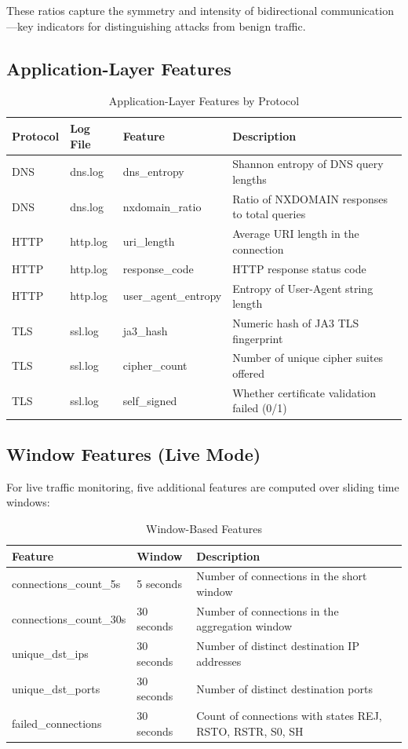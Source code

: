 \documentclass[12pt,a4paper,twoside]{report}
\begin{document}
These ratios capture the symmetry and intensity of bidirectional communication—key indicators for distinguishing attacks from benign traffic.

\subsection{Application-Layer Features}

\begin{table}[H]
\centering
\caption{Application-Layer Features by Protocol}
\begin{tabularx}{\textwidth}{lllX}
\toprule
\textbf{Protocol} & \textbf{Log File} & \textbf{Feature} & \textbf{Description} \\
\midrule
DNS & dns.log & dns\_entropy & Shannon entropy of DNS query lengths \\
DNS & dns.log & nxdomain\_ratio & Ratio of NXDOMAIN responses to total queries \\
HTTP & http.log & uri\_length & Average URI length in the connection \\
HTTP & http.log & response\_code & HTTP response status code \\
HTTP & http.log & user\_agent\_entropy & Entropy of User-Agent string length \\
TLS & ssl.log & ja3\_hash & Numeric hash of JA3 TLS fingerprint \\
TLS & ssl.log & cipher\_count & Number of unique cipher suites offered \\
TLS & ssl.log & self\_signed & Whether certificate validation failed (0/1) \\
\bottomrule
\end{tabularx}
\end{table}

\subsection{Window Features (Live Mode)}

For live traffic monitoring, five additional features are computed over sliding time windows:

\begin{table}[H]
\centering
\caption{Window-Based Features}
\begin{tabularx}{\textwidth}{llX}
\toprule
\textbf{Feature} & \textbf{Window} & \textbf{Description} \\
\midrule
connections\_count\_5s & 5 seconds & Number of connections in the short window \\
connections\_count\_30s & 30 seconds & Number of connections in the aggregation window \\
unique\_dst\_ips & 30 seconds & Number of distinct destination IP addresses \\
unique\_dst\_ports & 30 seconds & Number of distinct destination ports \\
failed\_connections & 30 seconds & Count of connections with states REJ, RSTO, RSTR, S0, SH \\
\bottomrule
\end{tabularx}
\end{table}
\end{document}

